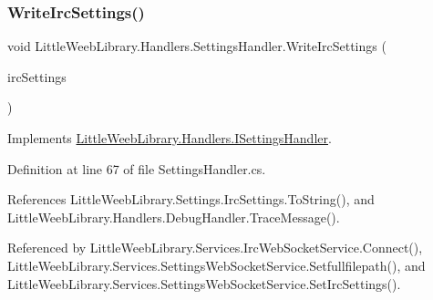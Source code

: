 \subsubsection{\texorpdfstring{Write\+Irc\+Settings()}{WriteIrcSettings()}}
{\footnotesize\ttfamily void Little\+Weeb\+Library.\+Handlers.\+Settings\+Handler.\+Write\+Irc\+Settings (\begin{DoxyParamCaption}\item[{\mbox{\hyperlink{class_little_weeb_library_1_1_settings_1_1_irc_settings}{Irc\+Settings}}}]{irc\+Settings }\end{DoxyParamCaption})}



Implements \mbox{\hyperlink{interface_little_weeb_library_1_1_handlers_1_1_i_settings_handler_a0c2480bc0a0ff28ed1dc68d32817efc6}{Little\+Weeb\+Library.\+Handlers.\+I\+Settings\+Handler}}.



Definition at line 67 of file Settings\+Handler.\+cs.



References Little\+Weeb\+Library.\+Settings.\+Irc\+Settings.\+To\+String(), and Little\+Weeb\+Library.\+Handlers.\+Debug\+Handler.\+Trace\+Message().



Referenced by Little\+Weeb\+Library.\+Services.\+Irc\+Web\+Socket\+Service.\+Connect(), Little\+Weeb\+Library.\+Services.\+Settings\+Web\+Socket\+Service.\+Setfullfilepath(), and Little\+Weeb\+Library.\+Services.\+Settings\+Web\+Socket\+Service.\+Set\+Irc\+Settings().


